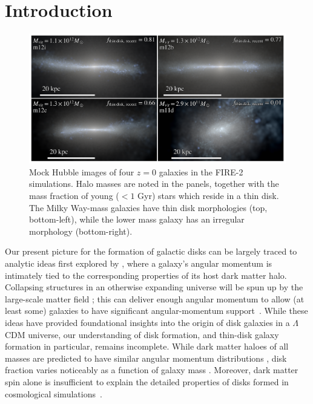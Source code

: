 \documentclass[fleqn,usenatbib]{mnras}
\begin{document}


\section{Introduction}
\label{s: introduction}

\begin{figure}
    \centering
    \includegraphics[width=\textwidth]{figures/stars.png}
    \caption{
    Mock Hubble images of four $z=0$ galaxies in the FIRE-2 simulations. Halo masses are noted in the panels, together with the mass fraction of young ($<1$ Gyr) stars which reside in a thin disk.  The Milky Way-mass galaxies have thin disk morphologies (top, bottom-left), while the lower mass galaxy has an irregular morphology (bottom-right).
    }
    \label{f: stars}
\end{figure}

Our present picture for the formation of galactic disks can be largely traced to analytic ideas first explored by \citet{fall1980}, where a galaxy's angular momentum is intimately tied to the corresponding properties of its host dark matter halo.
Collapsing structures in an otherwise expanding universe will be spun up by the large-scale matter field \citep{Peebles69};
this can deliver enough angular momentum to allow (at least some) galaxies to have significant angular-momentum support~\citep[e.g.][]{MMW98}. 
While these ideas have provided foundational insights into the origin of disk galaxies in a $\Lambda$CDM universe, our understanding of disk  formation, and thin-disk galaxy formation in particular, remains incomplete. 
While dark matter haloes of all masses are predicted to have similar angular momentum distributions \citep[e.g.][]{Barnes87}, disk fraction varies noticeably as a function of galaxy mass \citep[e.g.][]{Bernardi2010, Bluck2014, Moffett16}.
Moreover, dark matter spin alone is insufficient to explain the detailed properties of disks formed in cosmological simulations~\citep[e.g.][]{Sales2012, GK18, Rohr2022}.  
\end{document}
